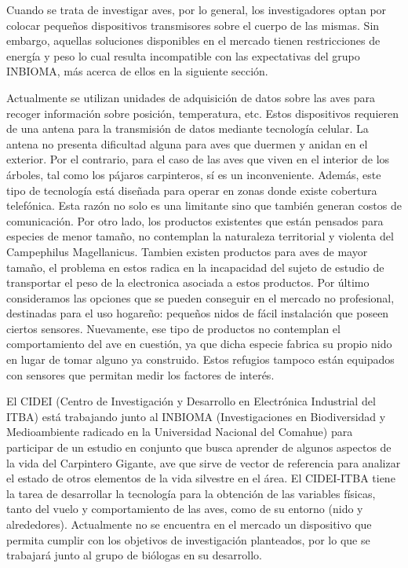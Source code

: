 %

%


Cuando se trata de investigar aves, por lo general, los investigadores optan por colocar pequeños dispositivos transmisores sobre el cuerpo de las mismas. Sin embargo, aquellas soluciones disponibles en el mercado tienen restricciones de energía y peso lo cual resulta incompatible con las expectativas del grupo INBIOMA, más acerca de ellos en la siguiente sección.

Actualmente se utilizan unidades de adquisición de datos sobre las aves para recoger información sobre posición, temperatura, etc. Estos dispositivos requieren de una antena para la transmisión de datos mediante tecnología celular. La antena no presenta dificultad alguna para aves que duermen y anidan en el exterior. Por el contrario, para el caso de las aves que viven en el interior de los árboles, tal como los pájaros carpinteros, sí es un inconveniente. Además, este tipo de tecnología está diseñada para operar en zonas donde existe cobertura telefónica. Esta razón no solo es una limitante sino que también generan costos de comunicación. Por otro lado, los productos existentes que están pensados para especies de menor tamaño, no contemplan la naturaleza territorial y violenta del Campephilus Magellanicus.
Tambien existen productos para aves de mayor tamaño, el problema en estos radica en la incapacidad del sujeto de estudio de transportar el peso de la electronica asociada a estos productos.
Por último consideramos las opciones que se pueden conseguir en el mercado no profesional, destinadas para el uso hogareño: pequeños nidos de fácil instalación que poseen ciertos sensores. Nuevamente, ese tipo de productos no contemplan el comportamiento del ave en cuestión, ya que dicha especie fabrica su propio nido en lugar de tomar alguno ya construido. Estos refugios tampoco están equipados con sensores que permitan medir los factores de interés. 


El CIDEI (Centro de Investigación y Desarrollo en Electrónica Industrial del ITBA) está trabajando junto al INBIOMA (Investigaciones en Biodiversidad y Medioambiente radicado en la Universidad Nacional del Comahue) para participar de un estudio en conjunto que busca aprender de algunos aspectos de la vida del Carpintero Gigante, ave que sirve de vector de referencia para analizar el estado de otros elementos de la vida silvestre en el área. El CIDEI-ITBA tiene la tarea de desarrollar la tecnología para la obtención de las variables físicas, tanto del vuelo y comportamiento de las aves, como de su entorno (nido y alrededores). Actualmente no se encuentra en el mercado un dispositivo que permita cumplir con los objetivos de investigación planteados, por lo que se trabajará junto al grupo de biólogas en su desarrollo.

